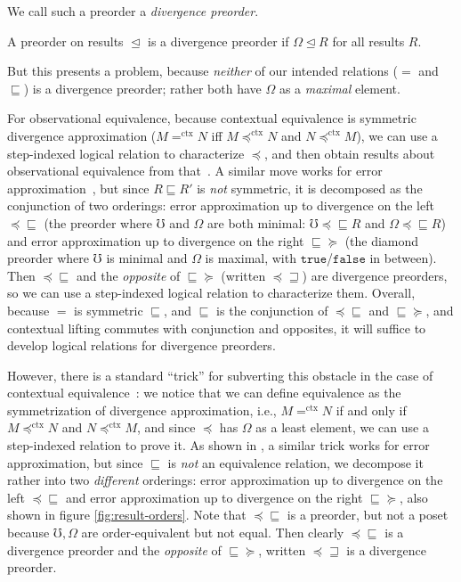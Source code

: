 \documentclass[acmsmall,nonacm]{acmart}
\newcommand{\ltdyn}{\sqsubseteq}
\newcommand{\gtdyn}{\sqsupseteq}
\newcommand{\apreorder}{\trianglelefteq}
\newcommand{\ctxize}[1]{\mathrel{{#1}^{\text{ctx}}}}
\newcommand{\tru}{\texttt{true}}
\newcommand{\fls}{\texttt{false}}
\newcommand{\err}{\mho}
\newcommand{\diverge}{\Omega}
\newcommand\errordivergeleft[0]{\preceq\ltdyn}
\newcommand\errordivergeright[0]{\ltdyn\succeq}
\newcommand\errordivergerightop[0]{\preceq\gtdyn}
\begin{document}
{\begin{longonly}
We call such a preorder a \emph{divergence preorder}.
\begin{definition}
  A preorder on results $\apreorder$ is a divergence preorder if
  $\diverge \apreorder R$ for all results $R$.
\end{definition}
\end{longonly}
%
But this presents a problem, because \emph{neither} of our intended
relations ($=$ and $\ltdyn$) is a divergence preorder; rather both have
$\diverge$ as a \emph{maximal} element.
%
\begin{shortonly}
  For observational equivalence, because contextual equivalence is
  symmetric divergence approximation ($M \ctxize= N$ iff $M
  \ctxize\preceq N$ and $N \ctxize\preceq M$), we can use a step-indexed
  logical relation to characterize $\preceq$, and then obtain results
  about observational equivalence from that~\cite{ahmed06:lr}.
  A similar move works for error
  approximation~\cite{newahmed18}, but since $R \ltdyn R'$ is \emph{not} symmetric, it is decomposed as the conjunction of two
  orderings: error approximation up to divergence on the left
  $\errordivergeleft$ (the preorder where $\err$ and $\diverge$ are both
  minimal: $\err \preceq\ltdyn R$ and $\diverge \preceq\ltdyn R$) and
  error approximation up to divergence on the right $\errordivergeright$
  (the diamond preorder where $\err$ is minimal and $\diverge$ is
  maximal, with $\tru$/$\fls$ in between).  Then $\preceq\ltdyn$ and the
  \emph{opposite} of $\ltdyn\succeq$ (written $\errordivergerightop$)
  are divergence preorders, so we can use a step-indexed logical
  relation to characterize them.  Overall, because $=$ is symmetric
  $\ltdyn$, and $\ltdyn$ is the conjunction of $\errordivergeleft$ and
  $\errordivergeright$, and contextual lifting commutes with conjunction
  and opposites, it will suffice to develop logical relations for
  divergence preorders.
\end{shortonly}

\begin{longonly}
However, there is a standard ``trick'' for subverting this obstacle in
the case of contextual equivalence~\cite{ahmed06:lr}: we notice
that we can define equivalence as the symmetrization of divergence
approximation, i.e., $M \ctxize= N$ if and only if $M \ctxize\preceq
N$ and $N \ctxize\preceq M$, and since $\preceq$ has $\diverge$ as
a least element, we can use a step-indexed relation to prove it.
%
As shown in \citet{newahmed18}, a similar trick works for error
approximation, but since $\ltdyn$ is \emph{not} an equivalence
relation, we decompose it rather into two \emph{different} orderings:
error approximation up to divergence on the left $\errordivergeleft$ and
error approximation up to divergence on the right $\errordivergeright$,
also shown in figure \ref{fig:result-orders}.
%
Note that $\errordivergeleft$ is a preorder, but not a poset because
$\err, \diverge$ are order-equivalent but not equal.
%
Then clearly $\errordivergeleft$ is a divergence preorder and the
\emph{opposite} of $\errordivergeright$, written $\errordivergerightop$
is a divergence preorder.


\end{longonly}}
\end{document}
